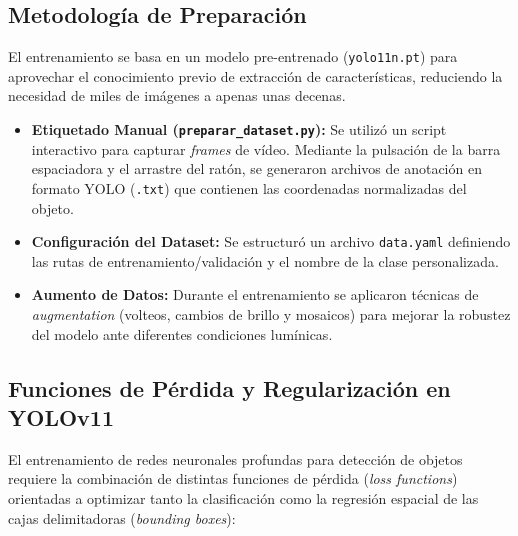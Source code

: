 \documentclass[12pt,a4paper]{article}
\begin{document}
\subsection{Metodología de Preparación}

El entrenamiento se basa en un modelo pre-entrenado (\texttt{yolo11n.pt}) para aprovechar el conocimiento previo de extracción de características, reduciendo la necesidad de miles de imágenes a apenas unas decenas.

\begin{itemize}
    \item \textbf{Etiquetado Manual (\texttt{preparar\_dataset.py}):} Se utilizó un script interactivo para capturar \textit{frames} de vídeo. Mediante la pulsación de la barra espaciadora y el arrastre del ratón, se generaron archivos de anotación en formato YOLO (\texttt{.txt}) que contienen las coordenadas normalizadas del objeto.
    \item \textbf{Configuración del Dataset:} Se estructuró un archivo \texttt{data.yaml} definiendo las rutas de entrenamiento/validación y el nombre de la clase personalizada.
    \item \textbf{Aumento de Datos:} Durante el entrenamiento se aplicaron técnicas de \textit{augmentation} (volteos, cambios de brillo y mosaicos) para mejorar la robustez del modelo ante diferentes condiciones lumínicas.
\end{itemize}

\subsection{Funciones de Pérdida y Regularización en YOLOv11}
El entrenamiento de redes neuronales profundas para detección de objetos requiere la combinación de distintas funciones de pérdida (\textit{loss functions}) orientadas a optimizar tanto la clasificación como la regresión espacial de las cajas delimitadoras (\textit{bounding boxes}):
\end{document}

